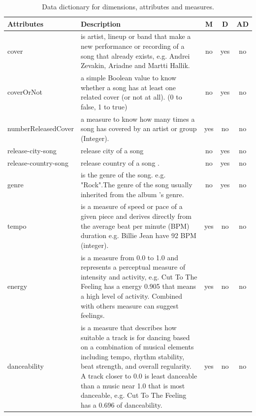 \documentclass[12pt]{article}
\begin{document}
\begin{table}[h!]
\begin{center}
\begin{tabular}{@{}|l|p{7cm}|c|c|c|@{}} 
\toprule
Attributes & Description & M & D & AD \\ [0.5ex] \midrule
cover & is artist, lineup or band that make a new performance or recording of a song that already exists, e.g. Andrei Zevakin, Ariadne and Martti Hallik. & no & yes & no \\ \hline
coverOrNot & a simple Boolean value to know whether a song has at least one related cover (or not at all). (0 to false, 1 to true) & no & yes & no \\ \hline
numberReleasedCover & a measure to know how many times a song has covered by an  artist or group (Integer). & yes & no & no \\ \hline\hline
release-city-song & release city of a song & no & yes & no \\ \hline
release-country-song & release country of a song . & no & yes & no \\ \bottomrule \midrule
genre & is the genre of the song. e.g. "Rock".The genre of the song usually inherited from the album 's genre. & no & yes & no \\ \bottomrule \midrule

tempo & is a measure of speed or pace of a given piece and derives directly from the average beat per minute (BPM) duration e.g. Billie Jean have 92 BPM (integer). & yes & no & no \\ \hline
energy & is a measure from 0.0 to 1.0 and represents a perceptual measure of intensity and activity, e.g. Cut To The Feeling has a energy 0.905 that means a high level of activity. Combined with others measure can suggest feelings. & yes & no & no \\ \hline
danceability & is a measure that describes how suitable a track is for dancing based on a combination of musical elements including tempo, rhythm stability, beat strength, and overall regularity. A track closer to 0.0 is least danceable than a music near 1.0 that is most danceable, e.g. Cut To The Feeling has a 0.696 of danceability. & yes & no & no \\ \hline
\end{tabular}
\caption{Data dictionary for dimensions, attributes and measures.}
\label{table:2}
\end{center}
\end{table}
\end{document}
